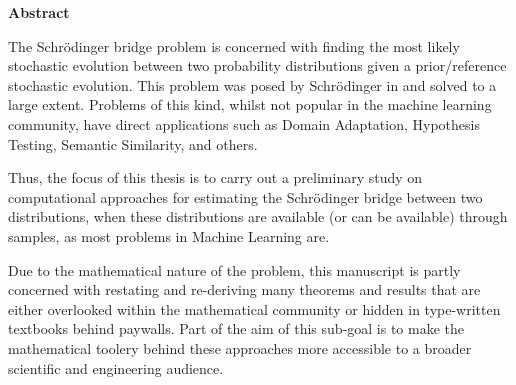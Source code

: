 \newpage
{\Huge \bf Abstract}
\vspace{24pt} 


The Schrödinger bridge problem is concerned with finding the most likely stochastic evolution between two probability distributions given a prior/reference stochastic evolution. This problem was posed by Schrödinger in \citep{schrodinger1931uber,schrodinger1932theorie} and solved to a large extent. Problems of this kind, whilst not popular in the machine learning community, have direct applications such as Domain Adaptation, Hypothesis Testing, Semantic Similarity, and others.

Thus, the focus of this thesis is to carry out a preliminary study on computational approaches for estimating the Schrödinger bridge between two distributions, when these distributions are available (or can be available) through samples, as most problems in Machine Learning are.

Due to the mathematical nature of the problem, this manuscript is partly concerned with restating and re-deriving many theorems and results that are either overlooked within the mathematical community or hidden in type-written textbooks behind paywalls. Part of the aim of this sub-goal is to make the mathematical toolery behind these approaches more accessible to a broader scientific and engineering audience.

\newpage
\vspace*{\fill}
